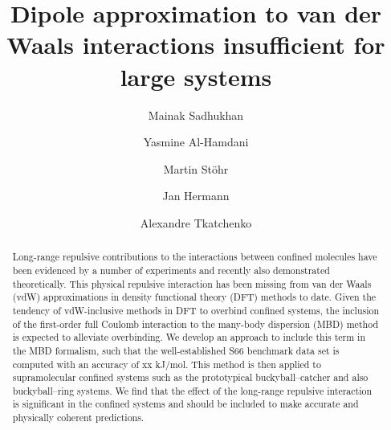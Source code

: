 \documentclass[aps,prl,groupaddress, twocolumn]{revtex4-1}  %
\begin{document}
\title{Dipole approximation to van der Waals interactions insufficient for large systems}

\author{Mainak Sadhukhan}
\author{Yasmine Al-Hamdani}
\author{Martin St\"{o}hr}
\author{Jan Hermann}
\author{Alexandre Tkatchenko}
\date{}







\begin{abstract}
Long-range repulsive contributions to the interactions between confined molecules have been evidenced by a number of experiments and recently also demonstrated theoretically. This physical repulsive interaction has been missing from van der Waals (vdW) approximations in density functional theory (DFT) methods to date. Given the tendency of vdW-inclusive methods in DFT to overbind confined systems, the inclusion of the first-order full Coulomb interaction to the many-body dispersion (MBD) method is expected to alleviate overbinding. We develop an approach to include this term in the MBD formalism, such that the well-established S66 benchmark data set is computed with an accuracy of xx kJ/mol. This method is then applied to supramolecular confined systems such as the prototypical buckyball--catcher and also buckyball--ring systems. We find that the effect of the long-range repulsive interaction is significant in the confined systems and should be included to make accurate and physically coherent predictions.
\end{abstract}
\maketitle

\end{document}
